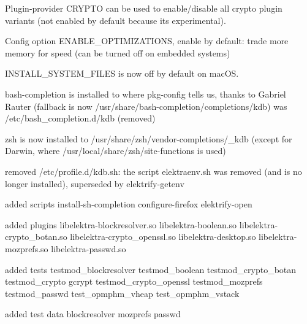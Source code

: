\begin{DoxyItemize}
\item Plugin-\/provider {\ttfamily C\+R\+Y\+P\+TO} can be used to enable/disable all crypto plugin variants (not enabled by default because its experimental).
\item Config option {\ttfamily E\+N\+A\+B\+L\+E\+\_\+\+O\+P\+T\+I\+M\+I\+Z\+A\+T\+I\+O\+NS}, enable by default\+: trade more memory for speed (can be turned off on embedded systems)
\item {\ttfamily I\+N\+S\+T\+A\+L\+L\+\_\+\+S\+Y\+S\+T\+E\+M\+\_\+\+F\+I\+L\+ES} is now off by default on mac\+OS.
\item bash-\/completion is installed to where pkg-\/config tells us, thanks to Gabriel Rauter (fallback is now {\ttfamily /usr/share/bash-\/completion/completions/kdb}) was {\ttfamily /etc/bash\+\_\+completion.d/kdb} (removed)
\item zsh is now installed to {\ttfamily /usr/share/zsh/vendor-\/completions/\+\_\+kdb} (except for Darwin, where {\ttfamily /usr/local/share/zsh/site-\/functions} is used)
\item removed {\ttfamily /etc/profile.d/kdb.\+sh}\+: the script {\ttfamily elektraenv.\+sh} was removed (and is no longer installed), superseded by {\ttfamily elektrify-\/getenv}
\item added scripts install-\/sh-\/completion configure-\/firefox elektrify-\/open
\item added plugins libelektra-\/blockresolver.\+so libelektra-\/boolean.\+so libelektra-\/crypto\+\_\+botan.\+so libelektra-\/crypto\+\_\+openssl.\+so libelektra-\/desktop.\+so libelektra-\/mozprefs.\+so libelektra-\/passwd.\+so
\item added tests testmod\+\_\+blockresolver testmod\+\_\+boolean testmod\+\_\+crypto\+\_\+botan testmod\+\_\+crypto gcrypt testmod\+\_\+crypto\+\_\+openssl testmod\+\_\+mozprefs testmod\+\_\+passwd test\+\_\+opmphm\+\_\+vheap test\+\_\+opmphm\+\_\+vstack
\item added test data blockresolver mozprefs passwd
\end{DoxyItemize}


